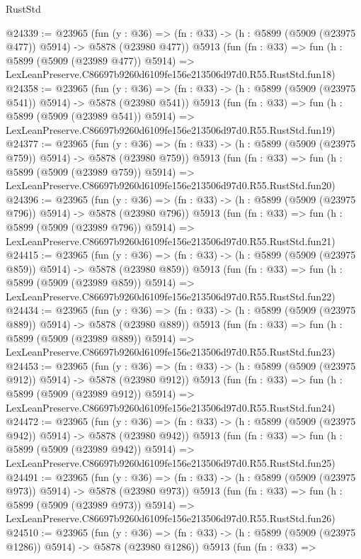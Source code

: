\begin{lexlean}{RustStd}
\begin{coremodule}
{{@24339 := @23965
    (fun (y : @36) => (fn : @33) -> (h : @5899 (@5909 (@23975 @477)) @5914) -> @5878 (@23980 @477))
    @5913
    (fun (fn : @33) =>
    fun (h : @5899 (@5909 (@23989 @477)) @5914) =>
    LexLeanPreserve.C86697b9260d6109fe156e213506d97d0.R55.RustStd.fun18)
@24358 := @23965
    (fun (y : @36) => (fn : @33) -> (h : @5899 (@5909 (@23975 @541)) @5914) -> @5878 (@23980 @541))
    @5913
    (fun (fn : @33) =>
    fun (h : @5899 (@5909 (@23989 @541)) @5914) =>
    LexLeanPreserve.C86697b9260d6109fe156e213506d97d0.R55.RustStd.fun19)
@24377 := @23965
    (fun (y : @36) => (fn : @33) -> (h : @5899 (@5909 (@23975 @759)) @5914) -> @5878 (@23980 @759))
    @5913
    (fun (fn : @33) =>
    fun (h : @5899 (@5909 (@23989 @759)) @5914) =>
    LexLeanPreserve.C86697b9260d6109fe156e213506d97d0.R55.RustStd.fun20)
@24396 := @23965
    (fun (y : @36) => (fn : @33) -> (h : @5899 (@5909 (@23975 @796)) @5914) -> @5878 (@23980 @796))
    @5913
    (fun (fn : @33) =>
    fun (h : @5899 (@5909 (@23989 @796)) @5914) =>
    LexLeanPreserve.C86697b9260d6109fe156e213506d97d0.R55.RustStd.fun21)
@24415 := @23965
    (fun (y : @36) => (fn : @33) -> (h : @5899 (@5909 (@23975 @859)) @5914) -> @5878 (@23980 @859))
    @5913
    (fun (fn : @33) =>
    fun (h : @5899 (@5909 (@23989 @859)) @5914) =>
    LexLeanPreserve.C86697b9260d6109fe156e213506d97d0.R55.RustStd.fun22)
@24434 := @23965
    (fun (y : @36) => (fn : @33) -> (h : @5899 (@5909 (@23975 @889)) @5914) -> @5878 (@23980 @889))
    @5913
    (fun (fn : @33) =>
    fun (h : @5899 (@5909 (@23989 @889)) @5914) =>
    LexLeanPreserve.C86697b9260d6109fe156e213506d97d0.R55.RustStd.fun23)
@24453 := @23965
    (fun (y : @36) => (fn : @33) -> (h : @5899 (@5909 (@23975 @912)) @5914) -> @5878 (@23980 @912))
    @5913
    (fun (fn : @33) =>
    fun (h : @5899 (@5909 (@23989 @912)) @5914) =>
    LexLeanPreserve.C86697b9260d6109fe156e213506d97d0.R55.RustStd.fun24)
@24472 := @23965
    (fun (y : @36) => (fn : @33) -> (h : @5899 (@5909 (@23975 @942)) @5914) -> @5878 (@23980 @942))
    @5913
    (fun (fn : @33) =>
    fun (h : @5899 (@5909 (@23989 @942)) @5914) =>
    LexLeanPreserve.C86697b9260d6109fe156e213506d97d0.R55.RustStd.fun25)
@24491 := @23965
    (fun (y : @36) => (fn : @33) -> (h : @5899 (@5909 (@23975 @973)) @5914) -> @5878 (@23980 @973))
    @5913
    (fun (fn : @33) =>
    fun (h : @5899 (@5909 (@23989 @973)) @5914) =>
    LexLeanPreserve.C86697b9260d6109fe156e213506d97d0.R55.RustStd.fun26)
@24510 := @23965
    (fun (y : @36) =>
    (fn : @33) -> (h : @5899 (@5909 (@23975 @1286)) @5914) -> @5878 (@23980 @1286))
    @5913
    (fun (fn : @33) =>
}}
\end{coremodule}
\end{lexlean}
